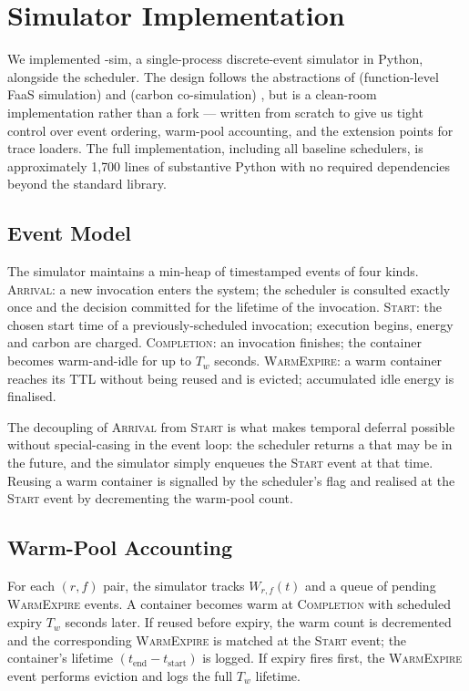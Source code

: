 \section{Simulator Implementation}
\label{sec:simulator}

We implemented \GreenFaaS-sim, a single-process discrete-event
simulator in Python, alongside the scheduler. The design follows the
abstractions of  (function-level FaaS simulation) and
 (carbon co-simulation) \citep{faassim,vessim}, but is a
clean-room implementation rather than a fork --- written from scratch
to give us tight control over event ordering, warm-pool accounting,
and the extension points for trace loaders. The full implementation,
including all baseline schedulers, is approximately 1{,}700 lines of
substantive Python with no required dependencies beyond the standard
library.

\subsection{Event Model}

The simulator maintains a min-heap of timestamped events of four
kinds. \textsc{Arrival}: a new invocation enters the system; the
scheduler is consulted exactly once and the decision committed for
the lifetime of the invocation. \textsc{Start}: the chosen start time
of a previously-scheduled invocation; execution begins, energy and
carbon are charged. \textsc{Completion}: an invocation finishes; the
container becomes warm-and-idle for up to $T_w$ seconds.
\textsc{WarmExpire}: a warm container reaches its TTL without being
reused and is evicted; accumulated idle energy is finalised.

The decoupling of \textsc{Arrival} from \textsc{Start} is what makes
temporal deferral possible without special-casing in the event loop:
the scheduler returns a  that may be in the
future, and the simulator simply enqueues the \textsc{Start} event at
that time. Reusing a warm container is signalled by the scheduler's
 flag and realised at the \textsc{Start} event by
decrementing the warm-pool count.

\subsection{Warm-Pool Accounting}

For each $(r, f)$ pair, the simulator tracks $W_{r,f}(t)$ and a queue
of pending \textsc{WarmExpire} events. A container becomes warm at
\textsc{Completion} with scheduled expiry $T_w$ seconds later. If
reused before expiry, the warm count is decremented and the
corresponding \textsc{WarmExpire} is matched at the \textsc{Start}
event; the container's lifetime
$(t_{\mathrm{end}} - t_{\mathrm{start}})$ is logged. If expiry fires
first, the \textsc{WarmExpire} event performs eviction and logs the
full $T_w$ lifetime.

